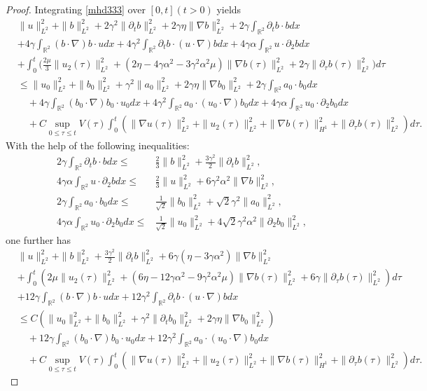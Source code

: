 \documentclass[10pt,a4paper]{amsart}
\def\R{\mathbb R}
\begin{document}
\begin{proof}
Integrating \eqref{mhd333} over $[0,t](t>0)$ yields
\begin{align*}
&\|u\|^2_{L^2}+\|b\|^2_{L^2}+2\gamma^2\|\partial_tb\|^2_{L^2}
+2\gamma\eta\|\nabla b\|^2_{L^2}+2\gamma\int_{\R^2}\partial_tb\cdot bdx
\nonumber\\
&+4\gamma\int_{\R^2}(b\cdot\nabla) b\cdot udx+4\gamma^2\int_{\R^2}\partial_{t}b\cdot (u\cdot\nabla )bdx+
4\gamma\alpha\int_{\R^2}u\cdot\partial_2 bdx\nonumber\\
&+\int_{0}^t\bigg(\frac{2\mu}{3}\|u_2(\tau)\|^2_{L^2}+(2\eta-4\gamma\alpha^2-3\gamma^2\alpha^2\mu)\|\nabla b(\tau)\|^2_{L^2}+2\gamma\|\partial_{\tau}b(\tau)\|^2_{L^2}\bigg)d\tau\nonumber\\
&\leq\|u_0\|^2_{L^2}+\|b_0\|^2_{L^2}+\gamma^2\|a_0\|^2_{L^2}
+2\gamma\eta\|\nabla b_0\|^2_{L^2}+2\gamma\int_{\R^2}a_0\cdot b_0dx\nonumber \\
&\quad+4\gamma\int_{\R^2}(b_0\cdot\nabla) b_0\cdot u_0dx+4\gamma^2\int_{\R^2}a_0\cdot (u_0\cdot\nabla) b_0dx+
4\gamma\alpha\int_{\R^2}u_0\cdot\partial_2 b_0dx\nonumber\\
&\quad+C\sup_{0\leq\tau\leq t}V(\tau)\int_0^t\left(\|\nabla u(\tau)\|_{L^{2}}^2+\|u_2(\tau)\|_{L^2}^2+\|\nabla b(\tau)\|_{H^1}^2+\|\partial_{\tau}b(\tau)\|_{L^{2}}^2\right)d\tau.
\end{align*}
With the help of the following inequalities:
\begin{align*}
2\gamma\int_{\R^2}\partial_tb\cdot bdx
\leq & \frac{2}{3}\|b\|_{L^2}^2+\frac{3\gamma^2}{2}\|\partial_t b\|_{L^2}^2, \\
4\gamma\alpha\int_{\R^2}u\cdot \partial_2bdx
\leq & \frac{2}{3}\|u\|_{L^2}^2+6\gamma^2\alpha^2\|\nabla b\|_{L^2}^2,\\
2\gamma\int_{\R^2}a_0\cdot b_0dx
\leq & \frac{1}{\sqrt{2}}\|b_0\|_{L^2}^2+\sqrt{2}\gamma^2\|a_0\|_{L^2}^2,\\
4\gamma\alpha\int_{\R^2}u_0\cdot\partial_2 b_0dx
\leq & \frac{1}{\sqrt{2}}\|u_0\|_{L^2}^2+4\sqrt{2}\gamma^2\alpha^2\|\partial_2 b_0\|_{L^2}^2,
\end{align*}
one further has
\begin{align}\label{energy1}
&\|u\|^2_{L^2}+\|b\|^2_{L^2}+\frac{3\gamma^2}{2}\|\partial_tb\|^2_{L^2}
+6\gamma(\eta-3\gamma\alpha^2)\|\nabla b\|^2_{L^2}\nonumber\\
&
+\int_{0}^t\left(2\mu\|u_2(\tau)\|^2_{L^2}+(6\eta-12\gamma\alpha^2-9\gamma^2\alpha^2\mu)\|\nabla b(\tau)\|^2_{L^2}+6\gamma\|\partial_{\tau}b(\tau)\|^2_{L^2}\right)d\tau\nonumber\\
&+12\gamma\int_{\R^2}(b\cdot\nabla) b\cdot udx+12\gamma^2\int_{\R^2}\partial_{t}b\cdot (u\cdot\nabla) bdx\nonumber\\
&\leq C\left(\|u_0\|^2_{L^2}+\|b_0\|^2_{L^2}+\gamma^2\|\partial_tb_0\|^2_{L^2}
+2\gamma\eta\|\nabla b_0\|^2_{L^2}\right)\nonumber\\
&\quad+12\gamma\int_{\R^2}(b_0\cdot\nabla) b_0\cdot u_0dx+12\gamma^2\int_{\R^2}a_0\cdot( u_0\cdot\nabla) b_0dx\nonumber\\
&\quad+C\sup_{0\leq\tau\leq t}V(\tau)\int_0^t\left(\|\nabla u(\tau)\|_{L^{2}}^2+\|u_2(\tau)\|_{L^2}^2+\|\nabla b(\tau)\|_{H^1}^2+\|\partial_{\tau}b(\tau)\|_{L^{2}}^2\right)d\tau.
\end{align}



\end{proof}
\end{document}

